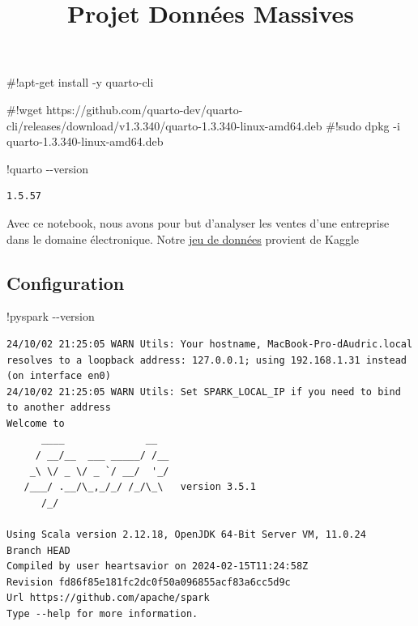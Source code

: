 \documentclass[
  letterpaper,
  DIV=11,
  numbers=noendperiod]{scrartcl}
\title{Projet Données Massives}
\author{}
\date{}
\newenvironment{Shaded}{\begin{snugshade}}{\end{snugshade}}
\newcommand{\CommentTok}[1]{\textcolor[rgb]{0.37,0.37,0.37}{#1}}
\newcommand{\NormalTok}[1]{\textcolor[rgb]{0.00,0.23,0.31}{#1}}
\newcommand{\OperatorTok}[1]{\textcolor[rgb]{0.37,0.37,0.37}{#1}}
\begin{document}
\maketitle


\begin{Shaded}
\begin{Highlighting}[]
\CommentTok{\#!apt{-}get install {-}y quarto{-}cli}
\end{Highlighting}
\end{Shaded}

\begin{Shaded}
\begin{Highlighting}[]
\CommentTok{\#!wget https://github.com/quarto{-}dev/quarto{-}cli/releases/download/v1.3.340/quarto{-}1.3.340{-}linux{-}amd64.deb}
\CommentTok{\#!sudo dpkg {-}i quarto{-}1.3.340{-}linux{-}amd64.deb}
\end{Highlighting}
\end{Shaded}

\begin{Shaded}
\begin{Highlighting}[]
\OperatorTok{!}\NormalTok{quarto }\OperatorTok{{-}{-}}\NormalTok{version}
\end{Highlighting}
\end{Shaded}

\begin{verbatim}
1.5.57
\end{verbatim}

Avec ce notebook, nous avons pour but d'analyser les ventes d'une
entreprise dans le domaine électronique. Notre
\href{https://www.kaggle.com/datasets/darkovichcycy/bd-sales?resource=download&select=Sales_August_2019.csv}{jeu
de données} provient de Kaggle

\subsection{Configuration}\label{configuration}

\begin{Shaded}
\begin{Highlighting}[]
\OperatorTok{!}\NormalTok{pyspark }\OperatorTok{{-}{-}}\NormalTok{version}
\end{Highlighting}
\end{Shaded}

\begin{verbatim}
24/10/02 21:25:05 WARN Utils: Your hostname, MacBook-Pro-dAudric.local resolves to a loopback address: 127.0.0.1; using 192.168.1.31 instead (on interface en0)
24/10/02 21:25:05 WARN Utils: Set SPARK_LOCAL_IP if you need to bind to another address
Welcome to
      ____              __
     / __/__  ___ _____/ /__
    _\ \/ _ \/ _ `/ __/  '_/
   /___/ .__/\_,_/_/ /_/\_\   version 3.5.1
      /_/
                        
Using Scala version 2.12.18, OpenJDK 64-Bit Server VM, 11.0.24
Branch HEAD
Compiled by user heartsavior on 2024-02-15T11:24:58Z
Revision fd86f85e181fc2dc0f50a096855acf83a6cc5d9c
Url https://github.com/apache/spark
Type --help for more information.
\end{verbatim}
\end{document}
